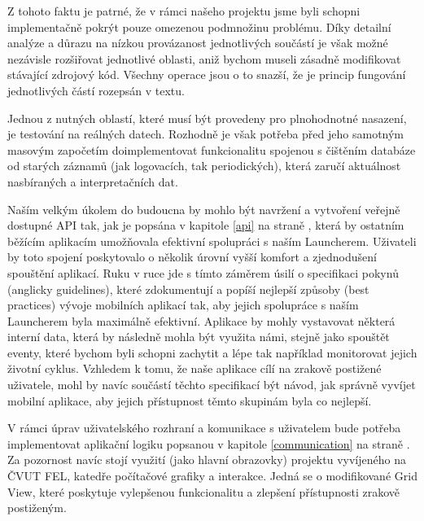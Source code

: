 \documentclass[thesis=M,czech]{FITthesis}[2012/06/26]
\begin{document}
Z tohoto faktu je patrné, že v rámci našeho projektu jsme byli schopni implementačně pokrýt pouze omezenou podmnožinu problému. Díky detailní analýze a důrazu na nízkou provázanost jednotlivých součástí je však možné nezávisle rozšiřovat jednotlivé oblasti, aniž bychom museli zásadně modifikovat stávající zdrojový kód. Všechny operace jsou o to snazší, že je princip fungování jednotlivých částí rozepsán v textu. 

Jednou z nutných oblastí, které musí být provedeny pro plnohodnotné nasazení, je testování na reálných datech. Rozhodně je však potřeba před jeho samotným masovým započetím doimplementovat funkcionalitu spojenou s čištěním databáze od starých záznamů (jak logovacích, tak periodických), která zaručí aktuálnost nasbíraných a interpretačních dat.

Naším velkým úkolem do budoucna by mohlo být navržení a vytvoření veřejně dostupné API tak, jak je popsána v kapitole \ref{api} na straně \pageref{api}, která by ostatním běžícím aplikacím umožňovala efektivní spolupráci s naším Launcherem. Uživateli by toto spojení poskytovalo o několik úrovní vyšší komfort a zjednodušení spouštění aplikací. Ruku v ruce jde s tímto záměrem úsilí o specifikaci pokynů (anglicky guidelines), které zdokumentují a popíší nejlepší způsoby (best practices) vývoje mobilních aplikací tak, aby jejich spolupráce s naším Launcherem byla maximálně efektivní. Aplikace by mohly vystavovat některá interní data, která by následně mohla být využita námi, stejně jako spouštět eventy, které bychom byli schopni zachytit a lépe tak například monitorovat jejich životní cyklus. Vzhledem k tomu, že naše aplikace cílí na zrakově postižené uživatele, mohl by navíc součástí těchto specifikací být návod, jak správně vyvíjet mobilní aplikace, aby jejich přístupnost těmto skupinám byla co nejlepší.

V rámci úprav uživatelského rozhraní a komunikace s uživatelem bude potřeba implementovat aplikační logiku popsanou v kapitole \ref{communication} na straně \pageref{communication}. Za pozornost navíc stojí využití (jako hlavní obrazovky) projektu vyvíjeného na ČVUT FEL, katedře počítačové grafiky a interakce. Jedná se o modifikované Grid View\cite{grid_view}, které poskytuje vylepšenou funkcionalitu a zlepšení přístupnosti zrakově postiženým.
\end{document}
